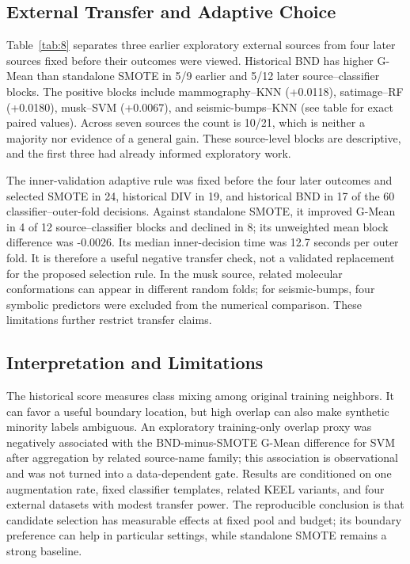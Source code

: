 \documentclass[pdflatex]{sn-jnl}
\begin{document}
\subsection{External Transfer and Adaptive Choice}

Table~\ref{tab:8} separates three earlier exploratory external sources from four later sources fixed before their outcomes were viewed. Historical BND has higher G-Mean than standalone SMOTE in 5/9 earlier and 5/12 later source--classifier blocks. The positive blocks include mammography--KNN (+0.0118), satimage--RF (+0.0180), musk--SVM (+0.0067), and seismic-bumps--KNN (see table for exact paired values). Across seven sources the count is 10/21, which is neither a majority nor evidence of a general gain. These source-level blocks are descriptive, and the first three had already informed exploratory work.



The inner-validation adaptive rule was fixed before the four later outcomes and selected SMOTE in 24, historical DIV in 19, and historical BND in 17 of the 60 classifier--outer-fold decisions. Against standalone SMOTE, it improved G-Mean in 4 of 12 source--classifier blocks and declined in 8; its unweighted mean block difference was -0.0026. Its median inner-decision time was 12.7 seconds per outer fold. It is therefore a useful negative transfer check, not a validated replacement for the proposed selection rule. In the musk source, related molecular conformations can appear in different random folds; for seismic-bumps, four symbolic predictors were excluded from the numerical comparison. These limitations further restrict transfer claims.

\subsection{Interpretation and Limitations}

The historical score measures class mixing among original training neighbors. It can favor a useful boundary location, but high overlap can also make synthetic minority labels ambiguous. An exploratory training-only overlap proxy was negatively associated with the BND-minus-SMOTE G-Mean difference for SVM after aggregation by related source-name family; this association is observational and was not turned into a data-dependent gate. Results are conditioned on one augmentation rate, fixed classifier templates, related KEEL variants, and four external datasets with modest transfer power. The reproducible conclusion is that candidate selection has measurable effects at fixed pool and budget; its boundary preference can help in particular settings, while standalone SMOTE remains a strong baseline.
\end{document}
